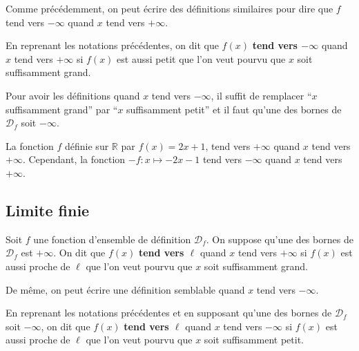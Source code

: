 	Comme précédemment, on peut écrire des définitions similaires pour dire que $f$ tend vers $-\infty$ quand $x$ tend vers $+\infty$.

	\begin{tip}
		En reprenant les notations précédentes, on dit que $f(x)$ \textbf{tend vers $-\infty$} quand $x$ tend vers $+\infty$ si $f(x)$ est aussi petit que l'on veut pourvu que $x$ soit suffisamment grand.
	\end{tip}

	\begin{tip}
		Pour avoir les définitions quand $x$ tend vers $-\infty$, il suffit de remplacer ``$x$ suffisamment grand'' par ``$x$ suffisamment petit'' et il faut qu'une des bornes de $\mathcal{D}_f$ soit $-\infty$.
	\end{tip}

	\begin{tip}[Exemple]
		La fonction $f$ définie sur $\mathbb{R}$ par $f(x) = 2x+1$, tend vers $+\infty$ quand $x$ tend vers $+\infty$. Cependant, la fonction $-f : x \mapsto -2x - 1$ tend vers $-\infty$ quand $x$ tend vers $+\infty$.
	\end{tip}

	\subsection{Limite finie}

	\begin{formula}
		Soit $f$ une fonction d'ensemble de définition $\mathcal{D}_f$. On suppose qu'une des bornes de $\mathcal{D}_f$ est $+\infty$.
		\newpar
		On dit que $f(x)$ \textbf{tend vers $\ell$} quand $x$ tend vers $+\infty$ si $f(x)$ est aussi proche de $\ell$ que l'on veut pourvu que $x$ soit suffisamment grand.
	\end{formula}

	De même, on peut écrire une définition semblable quand $x$ tend vers $-\infty$.

	\begin{tip}
		En reprenant les notations précédentes et en supposant qu'une des bornes de $\mathcal{D}_f$ soit $-\infty$, on dit que $f(x)$ \textbf{tend vers $\ell$} quand $x$ tend vers $-\infty$ si $f(x)$ est aussi proche de $\ell$ que l'on veut pourvu que $x$ soit suffisamment petit.
	\end{tip}

